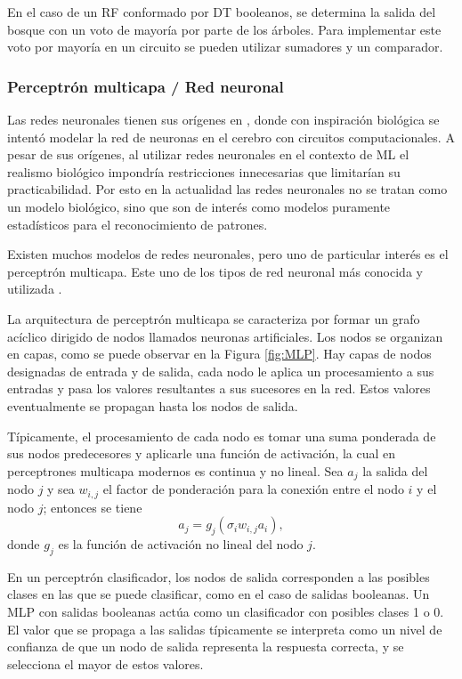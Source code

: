 En el caso de un RF conformado por DT booleanos, se determina la salida del
bosque con un voto de mayoría por parte de los árboles. Para implementar este
voto por mayoría en un circuito se pueden utilizar sumadores y un comparador.

\subsubsection{Perceptrón multicapa / Red neuronal}

Las redes neuronales tienen sus orígenes en \cite{mcculloch_logical_1943},
donde con inspiración biológica se intentó modelar la red de neuronas en el
cerebro con circuitos computacionales. A pesar de sus orígenes, al utilizar
redes neuronales en el contexto de ML el realismo biológico impondría
restricciones innecesarias que limitarían su practicabilidad. Por esto en la
actualidad las redes neuronales no se tratan como un modelo biológico, sino
que son de interés como modelos puramente estadísticos para el reconocimiento
de patrones.

Existen muchos modelos de redes neuronales, pero uno de particular interés es
el perceptrón multicapa. Este uno de los tipos de red neuronal más conocida y
utilizada \cite{popescu_multilayer_2009}.

La arquitectura de perceptrón multicapa se caracteriza por formar un grafo
acíclico dirigido de nodos llamados neuronas artificiales. Los nodos se
organizan en capas, como se puede observar en la Figura \ref{fig:MLP}. Hay
capas de nodos designadas de entrada y de salida, cada nodo le aplica un
procesamiento a sus entradas y pasa los valores resultantes a sus sucesores en
la red. Estos valores eventualmente se propagan hasta los nodos de salida.

Típicamente, el procesamiento de cada nodo es tomar una suma ponderada de sus
nodos predecesores y aplicarle una función de activación, la cual en
perceptrones multicapa modernos es continua y no lineal. Sea $a_j$ la salida
del nodo $j$ y sea $w_{i,j}$ el factor de ponderación para la conexión entre el
nodo $i$ y el nodo $j$; entonces se tiene
$$a_j = g_j\left(\sigma_i w_{i,j} a_i \right),$$
donde $g_j$ es la función de activación no lineal del nodo $j$.
\cite{russell2016artificial}

En un perceptrón clasificador, los nodos de salida corresponden a las posibles
clases en las que se puede clasificar, como en el caso de salidas booleanas. Un
MLP con salidas booleanas actúa como un clasificador con posibles clases 1 o 0.
El valor que se propaga a las salidas típicamente se interpreta como un nivel
de confianza de que un nodo de salida representa la respuesta correcta, y se
selecciona el mayor de estos valores.

